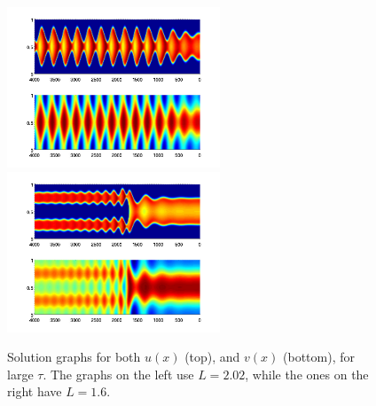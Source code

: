 \documentclass[a4paper,10pt]{article}
\begin{document}
% 
\begin{figure}[htb]
\begin{center}
\includegraphics[width=2.5in]{hopf_non_split}\includegraphics[width=2.5in]{hopf_split}
\caption{Solution graphs for both $u(x)$ (top), and $v(x)$ (bottom), for large $\tau$. The graphs on the left use $L=2.02$, while the ones on the right have $L=1.6$. }
\label{fig:hopf}
\end{center}
\end{figure}
% 



\end{document}
